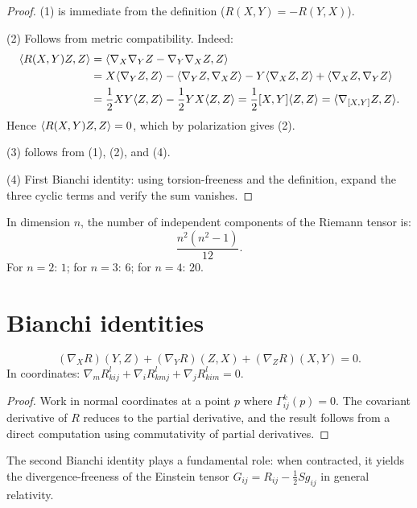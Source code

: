 \begin{proof}
(1) is immediate from the definition ($R(X,Y) = -R(Y,X)$).

(2) Follows from metric compatibility. Indeed:
\begin{align*}
    \langle R(X,Y)Z, Z \rangle &= \langle \nabla_X\nabla_Y Z - \nabla_Y\nabla_X Z, Z \rangle \\
    &= X\langle \nabla_Y Z, Z \rangle - \langle \nabla_Y Z, \nabla_X Z \rangle
    - Y\langle \nabla_X Z, Z \rangle + \langle \nabla_X Z, \nabla_Y Z \rangle \\
    &= \frac{1}{2}XY\langle Z, Z \rangle - \frac{1}{2}YX\langle Z, Z \rangle
    = \frac{1}{2}[X,Y]\langle Z, Z \rangle = \langle \nabla_{[X,Y]}Z, Z \rangle.
\end{align*}
Hence $\langle R(X,Y)Z, Z \rangle = 0$, which by polarization gives (2).

(3) follows from (1), (2), and (4).

(4) First Bianchi identity: using torsion-freeness and the definition, expand the
three cyclic terms and verify the sum vanishes.
\end{proof}

\begin{proposition}
In dimension $n$, the number of independent components of the Riemann tensor is:
\[
    \frac{n^2(n^2-1)}{12}.
\]
For $n = 2$: $1$; for $n = 3$: $6$; for $n = 4$: $20$.
\end{proposition}

\section{Bianchi identities}

\begin{theorem}
\[
    (\nabla_X R)(Y,Z) + (\nabla_Y R)(Z,X) + (\nabla_Z R)(X,Y) = 0.
\]
In coordinates: $\nabla_m R^l_{kij} + \nabla_i R^l_{kmj} + \nabla_j R^l_{kim} = 0$.
\end{theorem}

\begin{proof}
Work in normal coordinates at a point $p$ where $\Gamma^k_{ij}(p) = 0$. The
covariant derivative of $R$ reduces to the partial derivative, and the result
follows from a direct computation using commutativity of partial derivatives.
\end{proof}

\begin{remark}
The second Bianchi identity plays a fundamental role: when contracted, it yields
the divergence-freeness of the Einstein tensor
$G_{ij} = R_{ij} - \frac{1}{2}Sg_{ij}$ in general relativity.
\end{remark}

